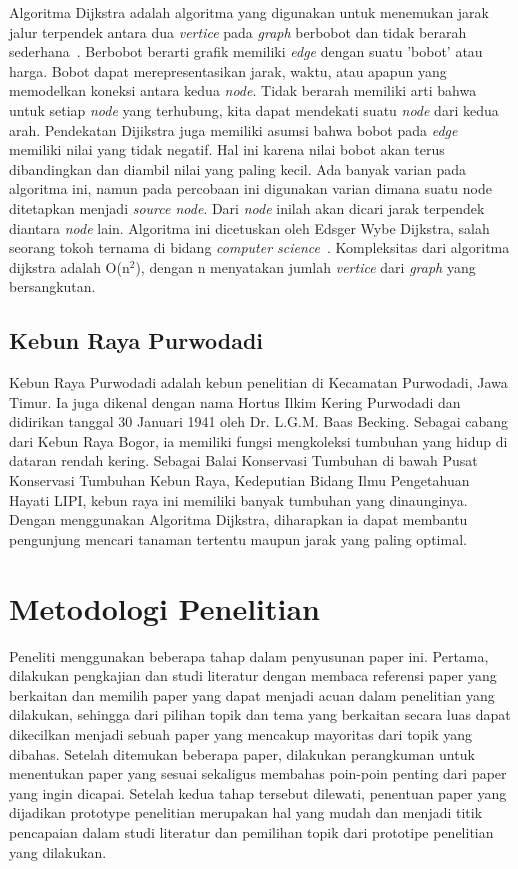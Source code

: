 \documentclass[conference]{IEEEtran}
\begin{document}
Algoritma Dijkstra adalah algoritma yang digunakan untuk menemukan jarak jalur terpendek antara dua \textit{vertice} pada \textit{graph} berbobot dan tidak berarah sederhana~\cite{Rosen2012}. Berbobot berarti grafik memiliki \textit{edge} dengan suatu ’bobot’ atau harga. Bobot dapat merepresentasikan jarak, waktu, atau apapun yang memodelkan koneksi antara kedua \textit{node}. Tidak berarah memiliki arti bahwa untuk setiap \textit{node} yang terhubung, kita dapat mendekati suatu \textit{node} dari kedua arah. Pendekatan Dijikstra juga memiliki asumsi bahwa bobot pada \textit{edge} memiliki nilai yang tidak negatif. Hal ini karena nilai bobot akan terus dibandingkan dan diambil nilai yang paling kecil. Ada banyak varian pada algoritma ini, namun pada percobaan ini digunakan varian dimana suatu node ditetapkan menjadi \textit{source node}. Dari \textit{node} inilah akan dicari jarak terpendek diantara \textit{node} lain. Algoritma ini dicetuskan oleh Edsger Wybe Dijkstra, salah seorang tokoh ternama di bidang \textit{computer science}~\cite{Dijkstra1959}. Kompleksitas dari algoritma dijkstra adalah O(n$^2$), dengan n menyatakan jumlah \textit{vertice} dari \textit{graph} yang bersangkutan.

\subsection{Kebun Raya Purwodadi}
Kebun Raya Purwodadi adalah kebun penelitian di Kecamatan Purwodadi, Jawa Timur. Ia juga dikenal dengan nama Hortus Ilkim Kering Purwodadi dan didirikan tanggal 30 Januari 1941 oleh Dr. L.G.M. Baas Becking. Sebagai cabang dari Kebun Raya Bogor, ia memiliki fungsi mengkoleksi tumbuhan yang hidup di dataran rendah kering. Sebagai Balai Konservasi Tumbuhan di bawah Pusat Konservasi Tumbuhan Kebun Raya, Kedeputian Bidang Ilmu Pengetahuan Hayati LIPI, kebun raya ini memiliki banyak tumbuhan yang dinaunginya. Dengan menggunakan Algoritma Dijkstra, diharapkan ia dapat membantu pengunjung mencari tanaman tertentu maupun jarak yang paling optimal.

\section{Metodologi Penelitian}
Peneliti menggunakan beberapa tahap dalam penyusunan paper ini. Pertama, dilakukan pengkajian dan studi literatur dengan membaca referensi paper yang berkaitan dan memilih paper yang dapat menjadi acuan dalam penelitian yang dilakukan, sehingga dari pilihan topik dan tema yang berkaitan secara luas dapat dikecilkan menjadi sebuah paper yang mencakup mayoritas dari topik yang dibahas. Setelah ditemukan beberapa paper, dilakukan perangkuman untuk menentukan paper yang sesuai sekaligus membahas poin-poin penting dari paper yang ingin dicapai. Setelah kedua tahap tersebut dilewati, penentuan paper yang dijadikan prototype penelitian merupakan hal yang mudah dan menjadi titik pencapaian dalam studi literatur dan pemilihan topik dari prototipe penelitian yang dilakukan.
\end{document}

